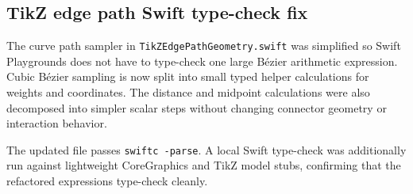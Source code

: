 \documentclass[a4paper]{article}
\title{}
\date{}
\author{Mohammad Rahmani}
\begin{document}
   \maketitle

   \begin{preview}
      \section*{TikZ edge path Swift type-check fix}

      The curve path sampler in \texttt{TikZEdgePathGeometry.swift} was simplified so Swift Playgrounds does not have to type-check one large Bézier arithmetic expression. Cubic Bézier sampling is now split into small typed helper calculations for weights and coordinates. The distance and midpoint calculations were also decomposed into simpler scalar steps without changing connector geometry or interaction behavior.

      The updated file passes \texttt{swiftc -parse}. A local Swift type-check was additionally run against lightweight CoreGraphics and TikZ model stubs, confirming that the refactored expressions type-check cleanly.
   \end{preview}

   
   
\end{document}
